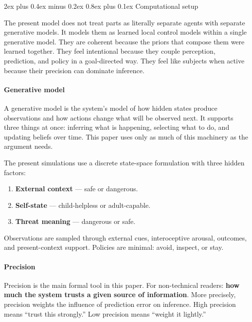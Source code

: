 \documentclass[12pt,a4paper]{article}
\makeatletter
\providecommand{\tightlist}{%
  \setlength{\itemsep}{0pt}\setlength{\parskip}{0pt}}
\renewcommand\subsection{\@startsection{subsection}{2}{0pt}%
  {2ex plus 0.4ex minus 0.2ex}%
  {0.8ex plus 0.1ex}%
  {\normalsize\itshape}}
\makeatother
\begin{document}
\subsection{Computational setup}\label{computational-setup}

The present model does not treat parts as literally separate agents with
separate generative models. It models them as learned local control
models within a single generative model. They are coherent because the
priors that compose them were learned together. They feel intentional
because they couple perception, prediction, and policy in a
goal-directed way. They feel like subjects when active because their
precision can dominate inference.

\paragraph{Generative model}\label{generative-model}

A generative model is the system's model of how hidden states produce
observations and how actions change what will be observed next. It
supports three things at once: inferring what is happening, selecting
what to do, and updating beliefs over time. This paper uses only as much
of this machinery as the argument needs.

The present simulations use a discrete state-space formulation with
three hidden factors:

\begin{enumerate}
\def\labelenumi{\arabic{enumi}.}
\tightlist
\item
  \textbf{External context} --- safe or dangerous.
\item
  \textbf{Self-state} --- child-helpless or adult-capable.
\item
  \textbf{Threat meaning} --- dangerous or safe.
\end{enumerate}

Observations are sampled through external cues, interoceptive arousal,
outcomes, and present-context support. Policies are minimal: avoid,
inspect, or stay.

\paragraph{Precision}\label{precision}

Precision is the main formal tool in this paper. For non-technical
readers: \textbf{how much the system trusts a given source of
information}. More precisely, precision weights the influence of
prediction error on inference. High precision means ``trust this
strongly.'' Low precision means ``weight it lightly.''
\end{document}
